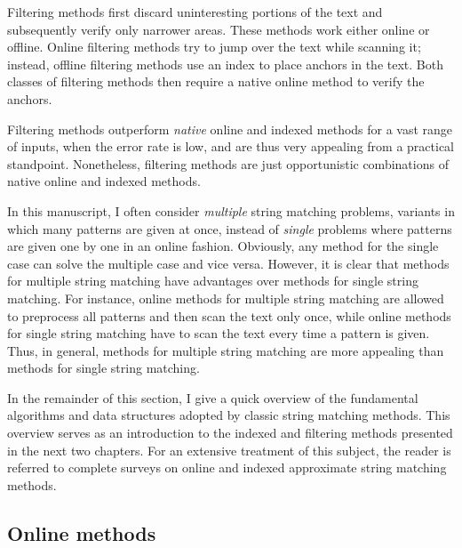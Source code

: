 Filtering methods first discard uninteresting portions of the text and subsequently verify only narrower areas.
These methods work either online or offline.
Online filtering methods try to jump over the text while scanning it; instead, offline filtering methods use an index to place anchors in the text.
Both classes of filtering methods then require a native online method to verify the anchors.

Filtering methods outperform \emph{native} online and indexed methods for a vast range of inputs, \ie when the error rate is low, and are thus very appealing from a practical standpoint.
Nonetheless, filtering methods are just opportunistic combinations of native online and indexed methods.

In this manuscript, I often consider \emph{multiple} string matching problems, \ie variants in which many patterns are given at once, instead of \emph{single} problems where patterns are given one by one in an online fashion.
Obviously, any method for the single case can solve the multiple case and vice versa.
However, it is clear that methods for multiple string matching have advantages over methods for single string matching.
For instance, online methods for multiple string matching are allowed to preprocess all patterns and then scan the text only once, while online methods for single string matching have to scan the text every time a pattern is given.
Thus, in general, methods for multiple string matching are more appealing than methods for single string matching.

In the remainder of this section, I give a quick overview of the fundamental algorithms and data structures adopted by classic string matching methods.
This overview serves as an introduction to the indexed and filtering methods presented in the next two chapters.
For an extensive treatment of this subject, the reader is referred to complete surveys on online \citep{Navarro2001a} and indexed \citep{Navarro2001} approximate string matching methods.


\subsection{Online methods}
\label{sub:introonline}


